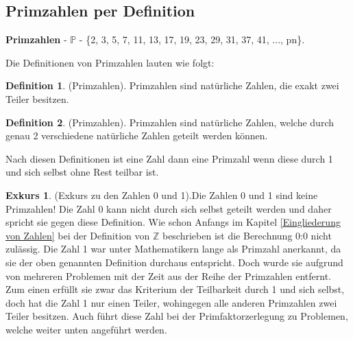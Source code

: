 \documentclass[12pt,a4paper]{article}
\theoremstyle{definition}
\newtheorem{defi}{Definition}[section]
\newtheorem{exkurs}{Exkurs}
\begin{document}
\subsection{Primzahlen per Definition}\label{Primzahlen per Definition}
\textbf{Primzahlen} - $\mathbb{P}$ - \{2, 3, 5, 7, 11, 13, 17, 19, 23, 29, 31, 37, 41, ..., pn\}.

Die Definitionen von Primzahlen lauten wie folgt:
\begin{defi}(Primzahlen).\newline
Primzahlen sind natürliche Zahlen, die exakt zwei Teiler besitzen.\end{defi}
\begin{defi}(Primzahlen).\newline
Primzahlen sind natürliche Zahlen, welche durch genau 2 verschiedene natürliche Zahlen geteilt werden können.\end{defi}

Nach diesen Definitionen ist eine Zahl dann eine Primzahl wenn diese durch 1 und sich selbst ohne Rest teilbar ist.

\begin{exkurs}(Exkurs zu den Zahlen 0 und 1).\label{Exkurs zu den Zahlen 0 und 1}\newline
Die Zahlen 0 und 1 sind keine Primzahlen!
Die Zahl 0 kann nicht durch sich selbst geteilt werden und daher spricht sie gegen diese Definition.
Wie schon Anfangs im Kapitel \ref{Eingliederung von Zahlen} bei der Definition von $\mathbb{Z}$ beschrieben ist die Berechnung 0:0 nicht zulässig.\newline
Die Zahl 1 war unter Mathematikern lange als Primzahl anerkannt, da sie der oben genannten Definition durchaus entspricht.
Doch wurde sie aufgrund von mehreren Problemen mit der Zeit aus der Reihe der Primzahlen entfernt.
Zum einen erfüllt sie zwar das Kriterium der Teilbarkeit durch 1 und sich selbst, doch hat die Zahl 1 nur einen Teiler, wohingegen alle anderen Primzahlen zwei Teiler besitzen.
Auch führt diese Zahl bei der Primfaktorzerlegung zu Problemen, welche weiter unten angeführt werden.
\end{exkurs}
\end{document}

